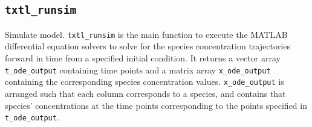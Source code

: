 \documentclass[english]{report}
\begin{document}
		\subsection*{\texttt{txtl\_runsim}} 
		
		Simulate model. \texttt{txtl\_runsim} is the main function to execute the MATLAB differential equation solvers to solve for the species concentration trajectories forward in time from a specified initial condition. It returns a vector array \texttt{t\_ode\_output} containing time points and a matrix array \texttt{x\_ode\_output} containing the corresponding species concentration values. \texttt{x\_ode\_output} is arranged such that each column corresponds to a species, and contains that species' concentrations at the time points corresponding to the points specified in \texttt{t\_ode\_output}. \\
		
\end{document}
